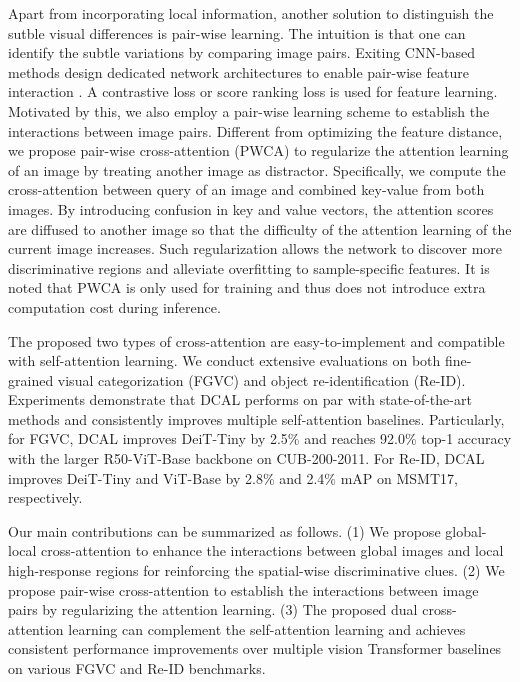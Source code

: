 Apart from incorporating local information, another solution to distinguish the sutble visual differences is pair-wise learning. The intuition is that one can identify the subtle variations by comparing image pairs. Exiting CNN-based methods design dedicated network architectures to enable pair-wise feature interaction \cite{zhuang2020learning,gao2020channel}. A contrastive loss \cite{gao2020channel} or score ranking loss \cite{zhuang2020learning} is used for feature learning. Motivated by this, we also employ a pair-wise learning scheme to establish the interactions between image pairs. Different from optimizing the feature distance, we propose pair-wise cross-attention (PWCA) to regularize the attention learning of an image by treating another image as distractor. Specifically, we compute the cross-attention between query of an image and combined key-value from both images. By introducing confusion in key and value vectors, the attention scores are diffused to another image so that the difficulty of the attention learning of the current image increases. Such regularization allows the network to discover more discriminative regions and alleviate overfitting to sample-specific features. It is noted that PWCA is only used for training and thus does not introduce extra computation cost during inference. 

The proposed two types of cross-attention are easy-to-implement and compatible with self-attention learning. We conduct extensive evaluations on both fine-grained visual categorization (FGVC) and object re-identification (Re-ID). Experiments demonstrate that DCAL performs on par with state-of-the-art methods and consistently improves multiple self-attention baselines. Particularly, for FGVC, DCAL improves DeiT-Tiny by 2.5\% and reaches 92.0\% top-1 accuracy with the larger R50-ViT-Base backbone on CUB-200-2011. For Re-ID, DCAL improves DeiT-Tiny and ViT-Base by 2.8\% and 2.4\% mAP on MSMT17, respectively.

Our main contributions can be summarized as follows. (1) We propose global-local cross-attention to enhance the interactions between global images and local high-response regions for reinforcing the spatial-wise discriminative clues. (2) We propose pair-wise cross-attention to establish the interactions between image pairs by regularizing the attention learning. (3) The proposed dual cross-attention learning can complement the self-attention learning and achieves consistent performance improvements over multiple vision Transformer baselines on various FGVC and Re-ID benchmarks. 


